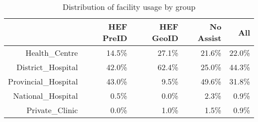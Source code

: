 \begin{table}[ht]
\centering
\begin{tabular}{rrrrr}
  \hline
 & HEF PreID & HEF GeoID & No Assist & All \\ 
  \hline
Health\_Centre & 14.5\% & 27.1\% & 21.6\% & 22.0\% \\ 
  District\_Hospital & 42.0\% & 62.4\% & 25.0\% & 44.3\% \\ 
  Provincial\_Hospital & 43.0\% & 9.5\% & 49.6\% & 31.8\% \\ 
  National\_Hospital & 0.5\% & 0.0\% & 2.3\% & 0.9\% \\ 
  Private\_Clinic & 0.0\% & 1.0\% & 1.5\% & 0.9\% \\ 
   \hline
\end{tabular}
\caption{Distribution of facility usage by group} 
\end{table}
